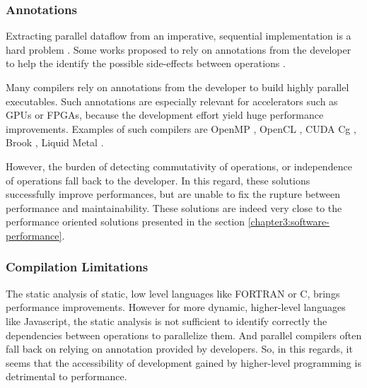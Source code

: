 \subsubsection{Annotations}

Extracting parallel dataflow from an imperative, sequential implementation is a hard problem \cite{Johnston2004a}.
Some works proposed to rely on annotations from the developer to help the identify the possible side-effects between operations \cite{Vandierendonck2010a,Fernandez2014a}.

Many compilers rely on annotations from the developer to build highly parallel executables.
Such annotations are especially relevant for accelerators such as GPUs or FPGAs, because the development effort yield huge performance improvements.
Examples of such compilers are OpenMP \cite{Dagum1998}, OpenCL \cite{Stone2010}, CUDA \cite{Nvidia2007} Cg \cite{Mark2003}, Brook \cite{Buck2004}, Liquid Metal \cite{Huang2008}.


However, the burden of detecting commutativity of operations, or independence of operations fall back to the developer.
In this regard, these solutions successfully improve performances, but are unable to fix the rupture between performance and maintainability.
These solutions are indeed very close to the performance oriented solutions presented in the section \ref{chapter3:software-performance}.



\subsubsection{Compilation Limitations}

The static analysis of static, low level languages like FORTRAN or C, brings performance improvements.
However for more dynamic, higher-level languages like Javascript, the static analysis is not sufficient to identify correctly the dependencies between operations to parallelize them.
And parallel compilers often fall back on relying on annotation provided by developers.
So, in this regards, it seems that the accessibility of development gained by higher-level programming is detrimental to performance.




